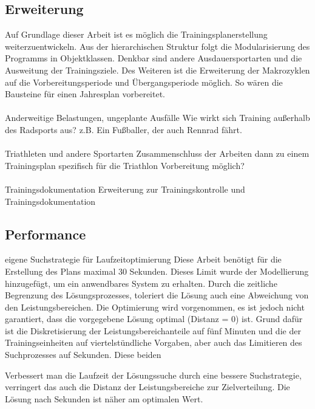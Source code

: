 \subsection{Erweiterung} 
Auf Grundlage dieser Arbeit ist es möglich die Trainingsplanerstellung weiterzuentwickeln. 
Aus der hierarchischen Struktur folgt die Modularisierung des Programms in Objektklassen.
Denkbar sind andere Ausdauersportarten und die Ausweitung der Trainingsziele. 
Des Weiteren ist die Erweiterung der Makrozyklen auf die Vorbereitungsperiode und Übergangsperiode möglich. So wären die Bausteine für einen Jahresplan vorbereitet. \\ \\
Anderweitige Belastungen, ungeplante Ausfälle
Wie wirkt sich Training außerhalb des Radsports aus? z.B. Ein Fußballer, der auch Rennrad fährt. \\ \\
Triathleten und andere Sportarten
Zusammenschluss der Arbeiten dann zu einem Trainingsplan spezifisch für die Triathlon Vorbereitung möglich? \\ \\
Trainingsdokumentation
Erweiterung zur Trainingskontrolle und Trainingsdokumentation

\subsection{Performance}
eigene Suchstrategie für Laufzeitoptimierung
Diese Arbeit benötigt für die Erstellung des Plans maximal 30 Sekunden. Dieses Limit wurde der Modellierung hinzugefügt, um ein anwendbares System zu erhalten. Durch die zeitliche Begrenzung des Lösungsprozesses, toleriert die Lösung auch eine Abweichung von den Leistungsbereichen. Die Optimierung wird vorgenommen, es ist jedoch nicht garantiert, dass die vorgegebene Lösung optimal (Distanz = 0) ist. Grund dafür ist die Diskretisierung der Leistungsbereichanteile auf fünf Minuten und die der Trainingseinheiten auf viertelstündliche Vorgaben, aber auch das Limitieren des Suchprozesses auf  Sekunden. Diese beiden 

Verbessert man die Laufzeit der Lösungssuche durch eine bessere Suchstrategie, verringert das auch die Distanz der Leistungsbereiche zur Zielverteilung. Die Lösung nach  Sekunden ist näher am optimalen Wert.


